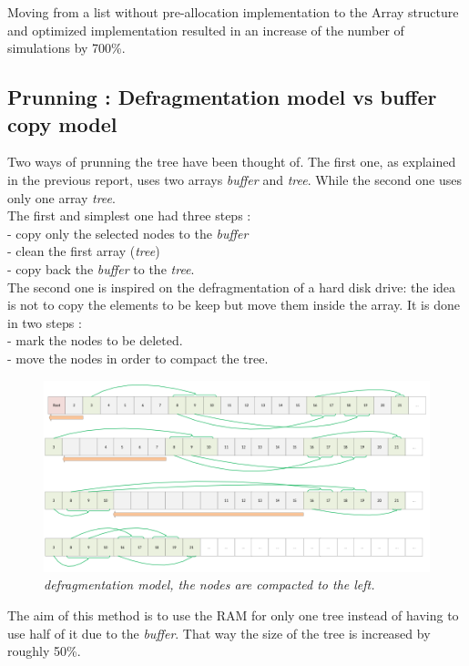 Moving from a list without pre-allocation implementation to the Array structure and optimized implementation resulted in an increase of the number of simulations by 700\%.

\subsection{Prunning : Defragmentation model vs buffer copy model}

Two ways of prunning the tree have been thought of. The first one, as  explained in the previous report, uses two arrays \textit{buffer} and \textit{tree}. While the second one uses only one array \textit{tree}.
\medskip\\
The first and simplest one had three steps : \\
- copy only the selected nodes to the \textit{buffer} \\
- clean the first array (\textit{tree}) \\
- copy back the \textit{buffer} to the \textit{tree}.
\medskip\\
The second one is inspired on the defragmentation of a hard disk drive: the idea is not to copy the elements to be keep but move them inside the array. It is done in two steps : \\
- mark the nodes to be deleted. \\
- move the nodes in order to compact the tree.
\begin{figure}[H] 
\centerline{\includegraphics[width=\textwidth]{Optimisations/array.png}}
\caption{\label{fig:Defrag}\textit{defragmentation model, the nodes are compacted to the left.}}
\end{figure}
The aim of this method is to use the RAM for only one tree instead of having to use half of it due to the \textit{buffer}. That way the size of the tree is increased by roughly 50\%.


